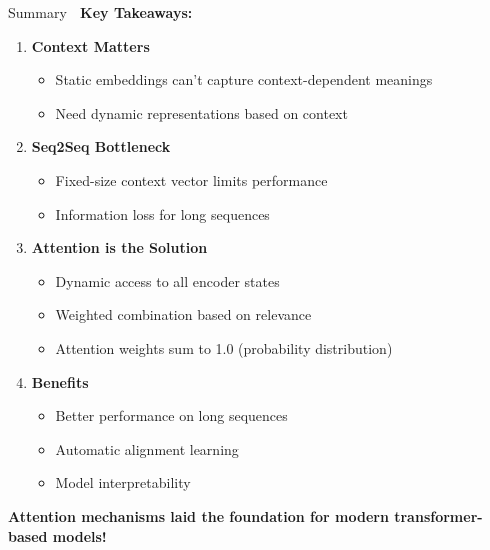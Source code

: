 \documentclass[aspectratio=169]{beamer}
\begin{document}
\begin{frame}[shrink=10]{Summary 🎯}
\textbf{Key Takeaways:}

\vspace{1em}

\begin{enumerate}\setlength{\itemsep}{0pt}
    \item \textbf{Context Matters}
    \begin{itemize}\setlength{\itemsep}{0pt}
        \item Static embeddings can't capture context-dependent meanings
        \item Need dynamic representations based on context
    \end{itemize}

    \item \textbf{Seq2Seq Bottleneck}
    \begin{itemize}\setlength{\itemsep}{0pt}
        \item Fixed-size context vector limits performance
        \item Information loss for long sequences
    \end{itemize}

    \item \textbf{Attention is the Solution}
    \begin{itemize}\setlength{\itemsep}{0pt}
        \item Dynamic access to all encoder states
        \item Weighted combination based on relevance
        \item Attention weights sum to 1.0 (probability distribution)
    \end{itemize}

    \item \textbf{Benefits}
    \begin{itemize}\setlength{\itemsep}{0pt}
        \item Better performance on long sequences
        \item Automatic alignment learning
        \item Model interpretability
    \end{itemize}
\end{enumerate}

\vspace{0.5em}
\textbf{Attention mechanisms laid the foundation for modern transformer-based models!}
\end{frame}
\end{document}
